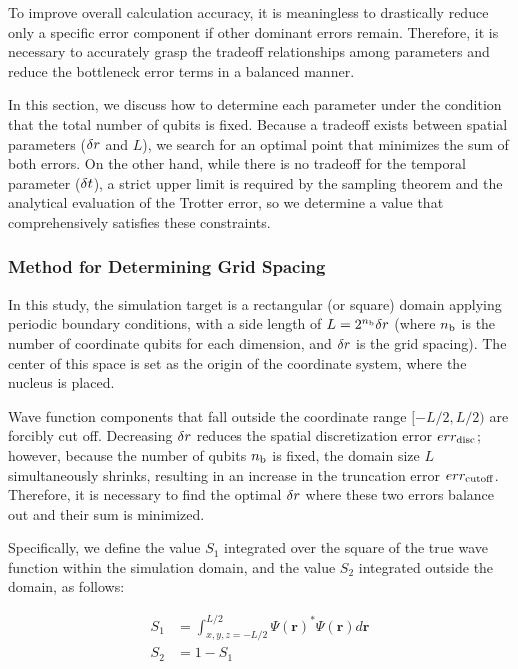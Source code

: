 \documentclass[report_2025.tex]{subfiles}
\begin{document}
To improve overall calculation accuracy, it is meaningless to drastically reduce
only a specific error component if other dominant errors remain. Therefore, it
is necessary to accurately grasp the tradeoff relationships among parameters and
reduce the bottleneck error terms in a balanced manner.

In this section, we discuss how to determine each parameter under the condition
that the total number of qubits is fixed. Because a tradeoff exists between
spatial parameters ($\delta r$ and $L$), we search for an optimal point that
minimizes the sum of both errors. On the other hand, while there is no tradeoff
for the temporal parameter ($\delta t$), a strict upper limit is required by the
sampling theorem and the analytical evaluation of the Trotter error, so we
determine a value that comprehensively satisfies these constraints.

\subsubsection{Method for Determining Grid Spacing}
\label{subsec:delta-r-selection-method}

In this study, the simulation target is a rectangular (or square) domain
applying periodic boundary conditions, with a side length of $L=2^{n_{\mathrm{b}}}\delta r$
(where $n_{\mathrm{b}}$ is the number of coordinate qubits for each dimension, and
$\delta r$ is the grid spacing). The center of this space is set as the origin of
the coordinate system, where the nucleus is placed.

Wave function components that fall outside the coordinate range $[-L/2, L/2)$
are forcibly cut off. Decreasing $\delta r$ reduces the spatial discretization
error $err_{\mathrm{disc}}$; however, because the number of qubits $n_{\mathrm{b}}$ is fixed, the
domain size $L$ simultaneously shrinks, resulting in an increase in the
truncation error $err_{\mathrm{cutoff}}$. Therefore, it is necessary to find the optimal
$\delta r$ where these two errors balance out and their sum is minimized.

Specifically, we define the value $S_1$ integrated over the square of the true
wave function within the simulation domain, and the value $S_2$ integrated
outside the domain, as follows:

\begin{align}
S_1 &= \int_{x,y,z=-L/2}^{L/2}\Psi(\bm{r})^{\ast}\Psi(\bm{r}) d\bm{r} \\
S_2 &= 1 - S_1
\end{align}
\end{document}
